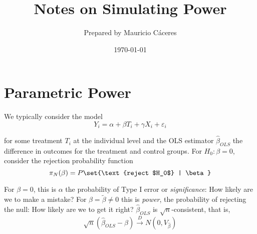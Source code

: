 \documentclass{article}
\title{\bfseries Notes on Simulating Power}
\author{\sffamily Prepared by Mauricio C\'aceres}
\date{\sffamily \today}
\renewcommand{\displayoptions}{
  \maketitle
  \pagenumbering{arabic}
}
\begin{document}
\displayoptions

\section{Parametric Power}
\label{sec:parametric_power}

We typically consider the model
\begin{equation}
Y_i = \alpha + \beta T_i + \gamma X_i + \varepsilon_i
\end{equation}

for some treatment $T_i$ at the individual level and the OLS estimator $\widehat{\beta}_{OLS}$ the difference in outcomes for the treatment and control groups. For $H_0: \beta = 0$, consider the rejection probability function
\begin{equation}
\pi_{N}(\beta) = P\set{\text{reject $H_0$} | \beta}
\end{equation}

For $\beta = 0$, this is $\alpha$ the probability of Type I error or \textit{significance}: How likely are we to make a mistake? For $\beta = \widetilde{\beta} \ne 0$ this is \textit{power}, the probability of rejecting the null: How likely are we to get it right? $\widehat{\beta}_{OLS}$ is $\sqrt{n}$-consistent, that is,
\[
  \sqrt{n} \left(\widehat{\beta}_{OLS} - \beta\right)
  \xrightarrow{D} N(0, V_{\widehat{\beta}})
\]
\end{document}
